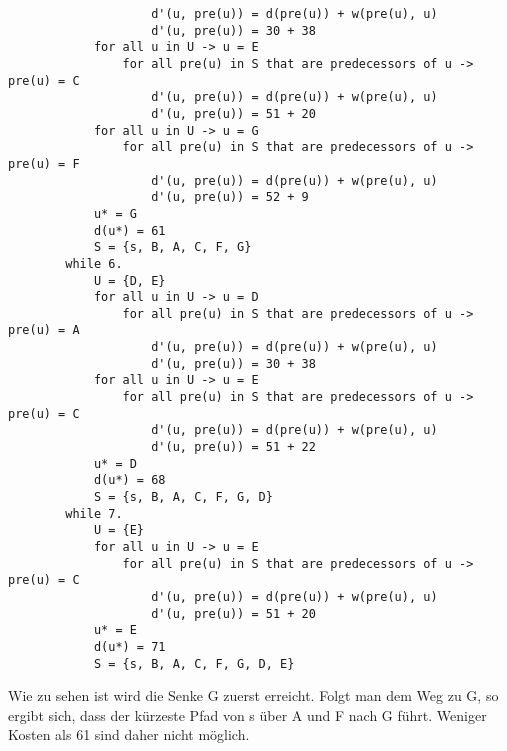 \documentclass[10pt,a4paper,oneside,ngerman,numbers=noenddot]{scrartcl}
\begin{document}
\begin{verbatim}
		            d'(u, pre(u)) = d(pre(u)) + w(pre(u), u)
		            d'(u, pre(u)) = 30 + 38
		    for all u in U -> u = E
		        for all pre(u) in S that are predecessors of u -> pre(u) = C
		            d'(u, pre(u)) = d(pre(u)) + w(pre(u), u)
		            d'(u, pre(u)) = 51 + 20
		    for all u in U -> u = G
		        for all pre(u) in S that are predecessors of u -> pre(u) = F
		            d'(u, pre(u)) = d(pre(u)) + w(pre(u), u)
		            d'(u, pre(u)) = 52 + 9
		    u* = G
		    d(u*) = 61
		    S = {s, B, A, C, F, G}
		while 6.
		    U = {D, E}
		    for all u in U -> u = D
		        for all pre(u) in S that are predecessors of u -> pre(u) = A
		            d'(u, pre(u)) = d(pre(u)) + w(pre(u), u)
		            d'(u, pre(u)) = 30 + 38
		    for all u in U -> u = E
		        for all pre(u) in S that are predecessors of u -> pre(u) = C
		            d'(u, pre(u)) = d(pre(u)) + w(pre(u), u)
		            d'(u, pre(u)) = 51 + 22
		    u* = D
		    d(u*) = 68
		    S = {s, B, A, C, F, G, D}
		while 7.
		    U = {E}
		    for all u in U -> u = E
		        for all pre(u) in S that are predecessors of u -> pre(u) = C
		            d'(u, pre(u)) = d(pre(u)) + w(pre(u), u)
		            d'(u, pre(u)) = 51 + 20
		    u* = E
		    d(u*) = 71
		    S = {s, B, A, C, F, G, D, E}
		\end{verbatim}
		
		Wie zu sehen ist wird die Senke G zuerst erreicht. Folgt man dem Weg zu G, so ergibt sich, dass der kürzeste Pfad von s über A und F nach G führt. Weniger Kosten als 61 sind daher nicht möglich.
\end{document}
